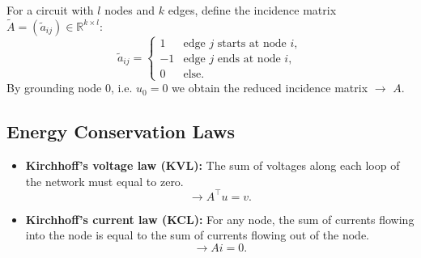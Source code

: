 	\begin{frame}
		\vfill
		For a circuit with $l$ nodes and $k$ edges, define the incidence matrix $\tilde{A} = (\tilde{a}_{ij}) \in \mathbb{R}^{k \times l}$:
		\begin{displaymath}
			\tilde{a}_{ij} = 
			\begin{cases}
				1 &   \text{edge $j$ starts at node $i$},\\
				-1 &  \text{edge $j$  ends at node $i$},\\
				0 & \text{else}.				
			\end{cases}
		\end{displaymath}
		By grounding node $0$, i.e. $u_0 = 0$ we obtain the reduced incidence matrix $\to$ $A$.
		\vfill
	\end{frame}

	\subsection{Energy Conservation Laws}
	\begin{frame}
		\vfill
		\begin{itemize}
			\item \textbf{Kirchhoff's voltage law (KVL):} \newline
			The sum of voltages along each loop of the network must equal to zero.
			\begin{equation}
				\label{KVL}
				\to A^\top  u = v.
			\end{equation}
			\item \textbf{Kirchhoff's current law (KCL):} \newline
			For any node, the sum of currents flowing into the node is equal to the sum of currents flowing out of the node.
			\begin{equation}
				\label{KCL}
				\to A  i = 0.
			\end{equation}
		\end{itemize}
		\vfill
	\end{frame}

